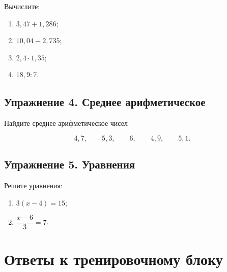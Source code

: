 \documentclass[a4paper,12pt]{article}
\begin{document}
Вычислите:

\begin{enumerate}[label=\arabic*)]
  \item \(3{,}47+1{,}286\);
  \item \(10{,}04-2{,}735\);
  \item \(2{,}4\cdot1{,}35\);
  \item \(18{,}9:7\).
\end{enumerate}

\vspace{0.7em}

\subsection*{\color{accent}Упражнение 4. Среднее арифметическое}

Найдите среднее арифметическое чисел

\[
4{,}7,\qquad
5{,}3,\qquad
6,\qquad
4{,}9,\qquad
5{,}1.
\]

\vspace{0.7em}

\subsection*{\color{accent}Упражнение 5. Уравнения}

Решите уравнения:

\begin{enumerate}[label=\arabic*)]
  \item \(3(x-4)=15\);
  \item \(\dfrac{x-6}{3}=7\).
\end{enumerate}


\clearpage

\section*{\color{darkaccent}Ответы к тренировочному блоку}

\renewcommand{\arraystretch}{1.45}
\end{document}

